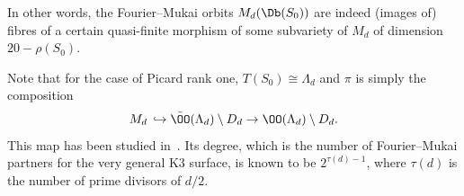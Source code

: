 In other words, the Fourier--Mukai orbits $M_d(\Db(S_0))$ are indeed (images of) fibres of a certain quasi-finite morphism of some subvariety of $M_d$ of dimension~$20-\rho(S_0)$.


\begin{rema}
Note that for the case of Picard rank one, $T(S_0)\cong\Lambda_d$ and $\pi$ is simply the composition
\[
M_d\,\hookrightarrow \tilde \OO(\Lambda_d)\setminus D_d\to \OO(\Lambda_d)\setminus D_d.
\]
This map has been studied in~\cite{Hosono,Og,Stel}. Its degree, which is the number of Fourier--Mukai partners for the very general K3 surface, is known to be $2^{\tau(d)-1}$, where $\tau(d)$ is the number of prime divisors of $d/2$.
\end{rema}



